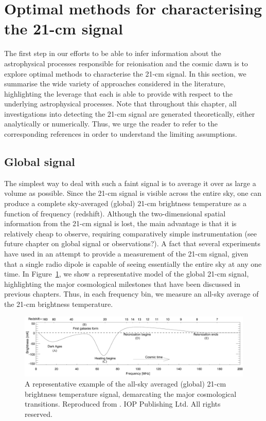\section{Optimal methods for characterising the 21-cm signal} \label{sec:methods}

The first step in our efforts to be able to infer information about the astrophysical processes responsible for reionisation and the cosmic dawn is to explore optimal methods to characterise the 21-cm signal. In this section, we summarise the wide variety of approaches considered in the literature, highlighting the leverage that each is able to provide with respect to the underlying astrophysical processes. Note that throughout this chapter, all investigations into detecting the 21-cm signal are generated theoretically, either analytically or numerically. Thus, we urge the reader to refer to the corresponding references in order to understand the limiting assumptions.

\subsection{Global signal} \label{sec:global}

The simplest way to deal with such a faint signal is to average it over as large a volume as possible. Since the 21-cm signal is visible across the entire sky, one can produce a complete sky-averaged (global) 21-cm brightness temperature as a function of frequency (redshift). Although the two-dimensional spatial information from the 21-cm signal is lost, the main advantage is that it is relatively cheap to observe, requiring comparatively simple instrumentation {\color{red} (see future chapter on global signal or observations?)}. A fact that several experiments have used in an attempt to provide a measurement of the 21-cm signal, given that a single radio dipole is capable of seeing essentially the entire sky at any one time. In Figure~\ref{fig:global}, we show a representative model of the global 21-cm signal, highlighting the major cosmological milestones that have been discussed in previous chapters. Thus, in each frequency bin, we measure an all-sky average of the 21-cm brightness temperature.

\begin{figure}[]
\begin{center}
\includegraphics[trim = 0.2cm 0.6cm 0.2cm 0.2cm, scale = 0.45]{Greig/GlobalSignal}
\end{center}
\caption{A representative example of the all-sky averaged (global) 21-cm brightness temperature signal, demarcating the major cosmological transitions. Reproduced from \cite{Pritchard:2012}. \textcopyright IOP Publishing Ltd. All rights reserved.}
\label{fig:global}
\end{figure}

